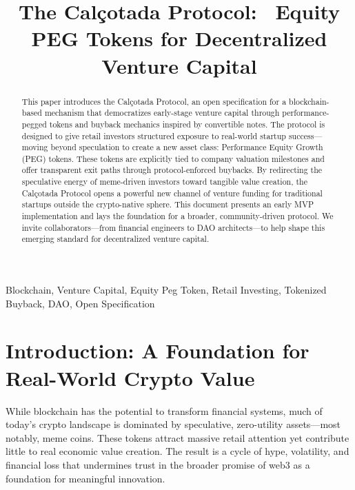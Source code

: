 \documentclass[conference]{IEEEtran}
\begin{document}
\thispagestyle{plain}
\pagestyle{plain}

\title{The Calçotada Protocol: \ Equity PEG Tokens for Decentralized Venture Capital}

\author{
}

\maketitle
\thispagestyle{plain} %

\begin{abstract}
This paper introduces the Calçotada Protocol, an open specification for a blockchain-based mechanism that democratizes early-stage venture capital through performance-pegged tokens and buyback mechanics inspired by convertible notes. The protocol is designed to give retail investors structured exposure to real-world startup success—moving beyond speculation to create a new asset class: Performance Equity Growth (PEG) tokens. These tokens are explicitly tied to company valuation milestones and offer transparent exit paths through protocol-enforced buybacks. By redirecting the speculative energy of meme-driven investors toward tangible value creation, the Calçotada Protocol opens a powerful new channel of venture funding for traditional startups outside the crypto-native sphere. This document presents an early MVP implementation and lays the foundation for a broader, community-driven protocol. We invite collaborators—from financial engineers to DAO architects—to help shape this emerging standard for decentralized venture capital.
\end{abstract}

\begin{IEEEkeywords}
Blockchain, Venture Capital, Equity Peg Token, Retail Investing, Tokenized Buyback, DAO, Open Specification
\end{IEEEkeywords}

\section{Introduction: A Foundation for Real-World Crypto Value}

While blockchain has the potential to transform financial systems, much of today’s crypto landscape is dominated by speculative, zero-utility assets—most notably, meme coins. These tokens attract massive retail attention yet contribute little to real economic value creation. The result is a cycle of hype, volatility, and financial loss that undermines trust in the broader promise of web3 as a foundation for meaningful innovation.
\end{document}
